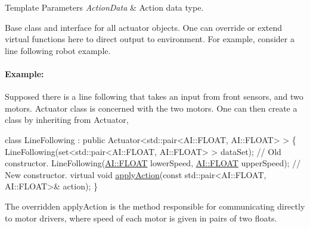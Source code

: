\begin{DoxyTemplParams}{Template Parameters}
{\em Action\+Data} & Action data type.\\
\hline
\end{DoxyTemplParams}
Base class and interface for all actuator objects. One can override or extend virtual functions here to direct output to environment. For example, consider a line following robot example.

\paragraph*{Example\+:}

Supposed there is a line following that takes an input from front sensors, and two motors. Actuator class is concerned with the two motors. One can then create a class by inheriting from Actuator,


\begin{DoxyCode}
\textcolor{keyword}{class }LineFollowing : \textcolor{keyword}{public} Actuator<std::pair<AI::FLOAT, AI::FLOAT> > \{
   LineFollowing(set<std::pair<AI::FLOAT, AI::FLOAT> > dataSet);  \textcolor{comment}{// Old constructor.}
   LineFollowing(\hyperlink{namespaceAI_a41b74884a20833db653dded3918e05c3}{AI::FLOAT} lowerSpeed, \hyperlink{namespaceAI_a41b74884a20833db653dded3918e05c3}{AI::FLOAT} upperSpeed);  \textcolor{comment}{// New constructor.}
   \textcolor{keyword}{virtual} \textcolor{keywordtype}{void} \hyperlink{classAI_1_1ActuatorBase_aecd4ee9cf0e33633c1c48028b4cb89a1}{applyAction}(\textcolor{keyword}{const} std::pair<AI::FLOAT, AI::FLOAT>& action);
\}
\end{DoxyCode}


The overridden apply\+Action is the method responsible for communicating directly to motor drivers, where speed of each motor is given in pairs of two floats. 

